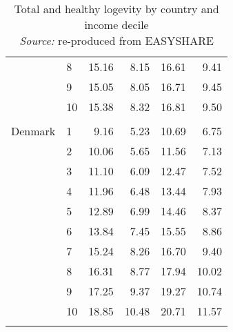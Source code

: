 \begin{table}
\begin{tabular}{llrrrr}
            & 8  &   15.16 &   8.15 &  16.61 &   9.41 \\
            & 9  &   15.05 &   8.05 &  16.71 &   9.45 \\
            & 10 &   15.38 &   8.32 &  16.81 &   9.50 \\
              & &    &   &   &  \\
Denmark & 1  &    9.16 &   5.23 &  10.69 &   6.75 \\
& 2  &   10.06 &   5.65 &  11.56 &   7.13 \\
 & 3  &   11.10 &   6.09 &  12.47 &   7.52 \\
 & 4  &   11.96 &   6.48 &  13.44 &   7.93 \\
& 5  &   12.89 &   6.99 &  14.46 &   8.37 \\
 & 6  &   13.84 &   7.45 &  15.55 &   8.86 \\
 & 7  &   15.24 &   8.26 &  16.70 &   9.40 \\
            & 8  &   16.31 &   8.77 &  17.94 &  10.02 \\
            & 9  &   17.25 &   9.37 &  19.27 &  10.74 \\
            & 10 &   18.85 &  10.48 &  20.71 &  11.57 \\
              & &    &   &   &  \\
\bottomrule
\end{tabular}
\captionsetup{justification=centering}
\caption{Total and healthy logevity by country and income decile \\ 
\textit{Source:} re-produced from EASYSHARE }
\end{table}




